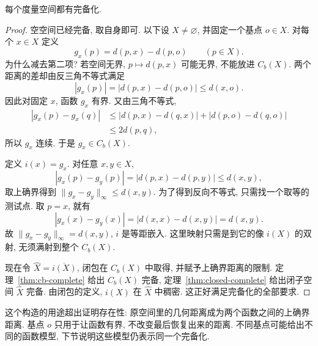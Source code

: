 \begin{theorem}\label{thm:completion-exists}
每个度量空间都有完备化.
\end{theorem}
\begin{proof}
空空间已经完备, 取自身即可. 以下设 $X\ne\varnothing$, 并固定一个基点 $o\in X$. 对每个 $x\in X$ 定义
\[
g_x(p)=d(p,x)-d(p,o)\qquad(p\in X).
\]
为什么减去第二项? 若空间无界, $p\mapsto d(p,x)$ 可能无界, 不能放进 $C_b(X)$. 两个距离的差却由反三角不等式满足
\[
|g_x(p)|=|d(p,x)-d(p,o)|\leq d(x,o).
\]
因此对固定 $x$, 函数 $g_x$ 有界. 又由三角不等式,
\begin{align*}
|g_x(p)-g_x(q)|
&\leq |d(p,x)-d(q,x)|+|d(p,o)-d(q,o)|\\
&\leq 2d(p,q),
\end{align*}
所以 $g_x$ 连续. 于是 $g_x\in C_b(X)$.

定义 $i(x)=g_x$. 对任意 $x,y\in X$,
\[
|g_x(p)-g_y(p)|=|d(p,x)-d(p,y)|\leq d(x,y),
\]
取上确界得到 $\|g_x-g_y\|_\infty\leq d(x,y)$. 为了得到反向不等式, 只需找一个取等的测试点. 取 $p=x$, 就有
\[
|g_x(x)-g_y(x)|=|d(x,x)-d(x,y)|=d(x,y).
\]
故 $\|g_x-g_y\|_\infty=d(x,y)$, $i$ 是等距嵌入. 这里映射只需是到它的像 $i(X)$ 的双射, 无须满射到整个 $C_b(X)$.

现在令 $\widehat X=\overline{i(X)}$, 闭包在 $C_b(X)$ 中取得, 并赋予上确界距离的限制. 定理~\ref{thm:cb-complete} 给出 $C_b(X)$ 完备, 定理~\ref{thm:closed-complete} 给出闭子空间 $\widehat X$ 完备. 由闭包的定义, $i(X)$ 在 $\widehat X$ 中稠密. 这正好满足完备化的全部要求.
\end{proof}

这个构造的用途超出证明存在性: 原空间里的几何距离成为两个函数之间的上确界距离. 基点 $o$ 只用于让函数有界, 不改变最后恢复出来的距离. 不同基点可能给出不同的函数模型, 下节说明这些模型仍表示同一个完备化.


